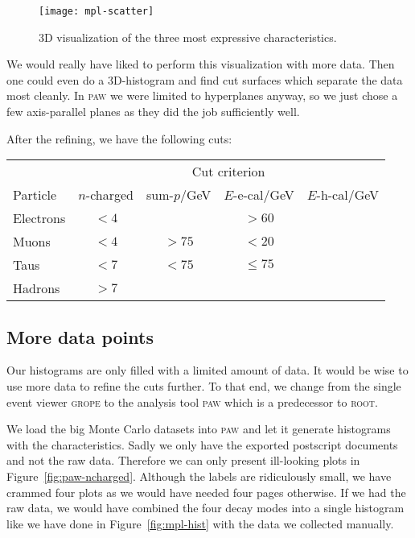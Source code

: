 \documentclass[11pt, english, fleqn, DIV=15, headinclude, BCOR=2cm]{scrreprt}
\newcommand\eecal{$E$-e-cal}
\newcommand\ehcal{$E$-h-cal}
\newcommand\sump{sum-$p$}
\newcommand\ncharged{$n$-charged}
\begin{document}
\begin{figure}
    \centering
    \texttt{[image: mpl-scatter]}
    \caption{%
        3D visualization of the three most expressive characteristics.
    }
    \label{fig:mpl-scatter}
\end{figure}

We would really have liked to perform this visualization with more data. Then
one could even do a 3D-histogram and find cut surfaces which separate the data
most cleanly. In \textsc{paw} we were limited to hyperplanes anyway, so we just
chose a few axis-parallel planes as they did the job sufficiently well.

\needspace{4cm}

After the refining, we have the following cuts:

\begin{tabular}{lcccc}
    \toprule
    & \multicolumn{4}{c}{Cut criterion} \\
    \cmidrule(l){2-5}
    Particle
    & \ncharged
    & \sump/\si{\giga\electronvolt}
    & \eecal/\si{\giga\electronvolt}
    & \ehcal/\si{\giga\electronvolt} \\
    \midrule
    Electrons & $< 4$ &  & $> 60$ &  \\
    Muons & $< 4$ & $> 75$ & $< 20$ &  \\
    Taus & $< 7$ & $< 75$ & $\leq 75$ &  \\
    Hadrons & $> 7$ &  &  &  \\
    \bottomrule
\end{tabular}

\subsection{More data points}

Our histograms are only filled with a limited amount of data. It would be wise
to use more data to refine the cuts further. To that end, we change from
the single event viewer \textsc{grope} to the analysis tool \textsc{paw} which
is a predecessor to \textsc{root}.

We load the big Monte Carlo datasets into \textsc{paw} and let it generate
histograms with the characteristics. Sadly we only have the exported postscript
documents and not the raw data. Therefore we can only present ill-looking plots
in Figure~\ref{fig:paw-ncharged}. Although the labels are ridiculously small,
we have crammed four plots as we would have needed four pages otherwise. If we
had the raw data, we would have combined the four decay modes into a single
histogram like we have done in Figure~\ref{fig:mpl-hist} with the data we
collected manually.
\end{document}
